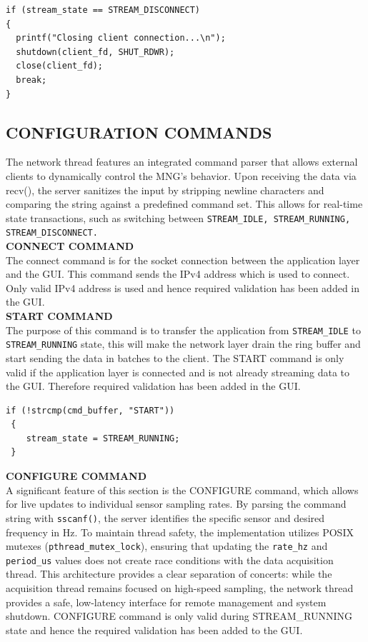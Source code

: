 \begin{verbatim}
if (stream_state == STREAM_DISCONNECT)
{
  printf("Closing client connection...\n");
  shutdown(client_fd, SHUT_RDWR);
  close(client_fd);
  break;
}
\end{verbatim}



\subsection{CONFIGURATION COMMANDS}
The network thread features an integrated command parser that allows external clients to dynamically control the MNG’s behavior. Upon receiving the data via recv(), the server sanitizes the input by stripping newline characters and comparing the string against a predefined command set. This allows for real-time state transactions, such as switching between \texttt{STREAM\_IDLE, STREAM\_RUNNING, STREAM\_DISCONNECT.}\\

\textbf{CONNECT COMMAND}\\
The connect command is for the socket connection between the application layer and the GUI. This command sends the IPv4 address which is used to connect. Only valid IPv4 address is used and hence required validation has been added in the GUI. \\


\textbf{START COMMAND}\\
The purpose of this command is to transfer the application from \texttt{STREAM\_IDLE} to \texttt{STREAM\_RUNNING} state, this will make the network layer drain the ring buffer and start sending the data in batches to the client. The START command is only valid if the application layer is connected and is not already streaming data to the GUI. Therefore required validation has been added in the GUI. 
\begin{verbatim}
if (!strcmp(cmd_buffer, "START"))
 {
    stream_state = STREAM_RUNNING;
 }
\end{verbatim}
\smallskip


\textbf{CONFIGURE COMMAND}\\
A significant feature of this section is the CONFIGURE command, which allows for live updates to individual sensor sampling rates. By parsing the command string with \texttt{sscanf()}, the server identifies the specific sensor and desired frequency in Hz. To maintain thread safety, the implementation utilizes POSIX mutexes (\texttt{pthread\_mutex\_lock}), ensuring that updating the \texttt{rate\_hz} and \texttt{period\_us} values does not create race conditions with the data acquisition thread. This architecture provides a clear separation of concerts: while the acquisition thread remains focused on high-speed sampling, the network thread provides a safe, low-latency interface for remote management and system shutdown. CONFIGURE command is only valid during STREAM\_RUNNING state and hence the required validation has been added to the GUI. 


